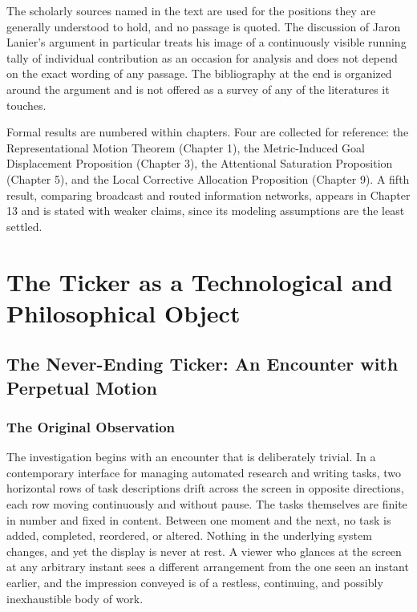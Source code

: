 \documentclass[11pt]{report}
\theoremstyle{definition}
\theoremstyle{remark}
\begin{document}
The scholarly sources named in the text are used for the positions they are generally understood to hold, and no passage is quoted. The discussion of Jaron Lanier's argument in particular treats his image of a continuously visible running tally of individual contribution as an occasion for analysis and does not depend on the exact wording of any passage. The bibliography at the end is organized around the argument and is not offered as a survey of any of the literatures it touches.

Formal results are numbered within chapters. Four are collected for reference: the Representational Motion Theorem (Chapter 1), the Metric-Induced Goal Displacement Proposition (Chapter 3), the Attentional Saturation Proposition (Chapter 5), and the Local Corrective Allocation Proposition (Chapter 9). A fifth result, comparing broadcast and routed information networks, appears in Chapter 13 and is stated with weaker claims, since its modeling assumptions are the least settled.

\part{The Ticker as a Technological and Philosophical Object}

\chapter{The Never-Ending Ticker: An Encounter with Perpetual Motion}

\section{The Original Observation}

The investigation begins with an encounter that is deliberately trivial. In a contemporary interface for managing automated research and writing tasks, two horizontal rows of task descriptions drift across the screen in opposite directions, each row moving continuously and without pause. The tasks themselves are finite in number and fixed in content. Between one moment and the next, no task is added, completed, reordered, or altered. Nothing in the underlying system changes, and yet the display is never at rest. A viewer who glances at the screen at any arbitrary instant sees a different arrangement from the one seen an instant earlier, and the impression conveyed is of a restless, continuing, and possibly inexhaustible body of work.
\end{document}

